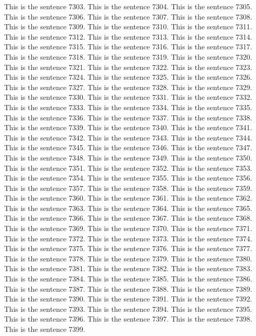 \documentclass{article}
\begin{document}
This is the sentence 7303.
This is the sentence 7304.
This is the sentence 7305.
This is the sentence 7306.
This is the sentence 7307.
This is the sentence 7308.
This is the sentence 7309.
This is the sentence 7310.
This is the sentence 7311.
This is the sentence 7312.
This is the sentence 7313.
This is the sentence 7314.
This is the sentence 7315.
This is the sentence 7316.
This is the sentence 7317.
This is the sentence 7318.
This is the sentence 7319.
This is the sentence 7320.
This is the sentence 7321.
This is the sentence 7322.
This is the sentence 7323.
This is the sentence 7324.
This is the sentence 7325.
This is the sentence 7326.
This is the sentence 7327.
This is the sentence 7328.
This is the sentence 7329.
This is the sentence 7330.
This is the sentence 7331.
This is the sentence 7332.
This is the sentence 7333.
This is the sentence 7334.
This is the sentence 7335.
This is the sentence 7336.
This is the sentence 7337.
This is the sentence 7338.
This is the sentence 7339.
This is the sentence 7340.
This is the sentence 7341.
This is the sentence 7342.
This is the sentence 7343.
This is the sentence 7344.
This is the sentence 7345.
This is the sentence 7346.
This is the sentence 7347.
This is the sentence 7348.
This is the sentence 7349.
This is the sentence 7350.
This is the sentence 7351.
This is the sentence 7352.
This is the sentence 7353.
This is the sentence 7354.
This is the sentence 7355.
This is the sentence 7356.
This is the sentence 7357.
This is the sentence 7358.
This is the sentence 7359.
This is the sentence 7360.
This is the sentence 7361.
This is the sentence 7362.
This is the sentence 7363.
This is the sentence 7364.
This is the sentence 7365.
This is the sentence 7366.
This is the sentence 7367.
This is the sentence 7368.
This is the sentence 7369.
This is the sentence 7370.
This is the sentence 7371.
This is the sentence 7372.
This is the sentence 7373.
This is the sentence 7374.
This is the sentence 7375.
This is the sentence 7376.
This is the sentence 7377.
This is the sentence 7378.
This is the sentence 7379.
This is the sentence 7380.
This is the sentence 7381.
This is the sentence 7382.
This is the sentence 7383.
This is the sentence 7384.
This is the sentence 7385.
This is the sentence 7386.
This is the sentence 7387.
This is the sentence 7388.
This is the sentence 7389.
This is the sentence 7390.
This is the sentence 7391.
This is the sentence 7392.
This is the sentence 7393.
This is the sentence 7394.
This is the sentence 7395.
This is the sentence 7396.
This is the sentence 7397.
This is the sentence 7398.
This is the sentence 7399.
\end{document}
